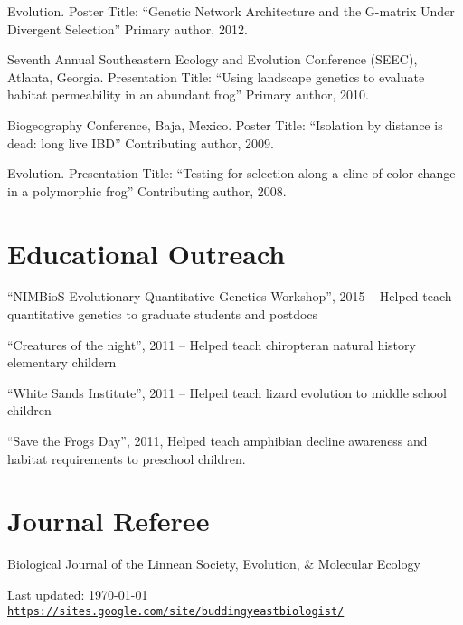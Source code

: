 \documentclass[letterpaper]{article}
\def\footerlink{https://sites.google.com/site/buddingyeastbiologist/}
\renewenvironment{itemize}{
  \begin{list}{}{
    \setlength{\leftmargin}{1.5em}
  }
}{
  \end{list}
}
\begin{document}
\begin{itemize}
\item Evolution. Poster Title: ``Genetic Network Architecture and the G-matrix Under Divergent Selection'' Primary author, 2012.
\item Seventh Annual Southeastern Ecology and Evolution Conference (SEEC), Atlanta, Georgia. Presentation Title: ``Using landscape genetics to evaluate habitat permeability in an abundant frog'' Primary author, 2010.
\item Biogeography Conference, Baja, Mexico. Poster Title: ``Isolation by distance is dead: long live IBD'' Contributing author, 2009.
\item Evolution.  Presentation Title: ``Testing for selection along a cline of color change in a polymorphic frog'' Contributing author, 2008.
\end{itemize}

\section*{Educational Outreach}
\begin{itemize}
\item ``NIMBioS Evolutionary Quantitative Genetics Workshop'', 2015 -- Helped teach quantitative genetics to graduate students and postdocs
\item ``Creatures of the night'', 2011 -- Helped teach chiropteran natural history elementary childern
\item ``White Sands Institute'', 2011 -- Helped teach lizard evolution to middle school children
\item ``Save the Frogs Day'', 2011, Helped teach amphibian decline awareness and habitat requirements to preschool children. 
\end{itemize}

\section*{Journal Referee}
\begin{itemize}
\item Biological Journal of the Linnean Society, Evolution, \& Molecular Ecology
\end{itemize}

\bigskip

\begin{center}
  \begin{footnotesize}
    Last updated: \today \\
    \href{\footerlink}{\texttt{\footerlink}}
  \end{footnotesize}
\end{center}
\end{document}
